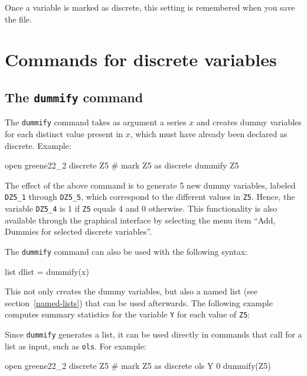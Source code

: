 Once a variable is marked as discrete, this setting is remembered when
you save the file.

\section{Commands for discrete variables}
\label{discr-commands}

\subsection{The \texttt{dummify} command}
\label{discr-dummify}

The \texttt{dummify} command takes as argument a series $x$ and creates
dummy variables for each distinct value present in $x$, which must
have already been declared as discrete.  Example:
\begin{code}
  open greene22_2
  discrete Z5 # mark Z5 as discrete
  dummify Z5
\end{code}

The effect of the above command is to generate 5 new dummy variables,
labeled \texttt{DZ5\_1} through \texttt{DZ5\_5}, which correspond to
the different values in \texttt{Z5}. Hence, the variable
\texttt{DZ5\_4} is 1 if \texttt{Z5} equals 4 and 0 otherwise. This
functionality is also available through the graphical interface by
selecting the menu item ``Add, Dummies for selected discrete variables''.

The \texttt{dummify} command can also be used with the following
syntax:
\begin{code}
  list dlist = dummify(x)
\end{code}
This not only creates the dummy variables, but also a named list (see
section~\ref{named-lists}) that can be used afterwards. The
following example computes summary statistics for the variable \texttt{Y} for
each value of \texttt{Z5}:

Since \texttt{dummify} generates a list, it can be used directly
in commands that call for a list as input, such as \texttt{ols}.  For
example:
\begin{code}
  open greene22_2
  discrete Z5 # mark Z5 as discrete
  ols Y 0 dummify(Z5)
\end{code}

